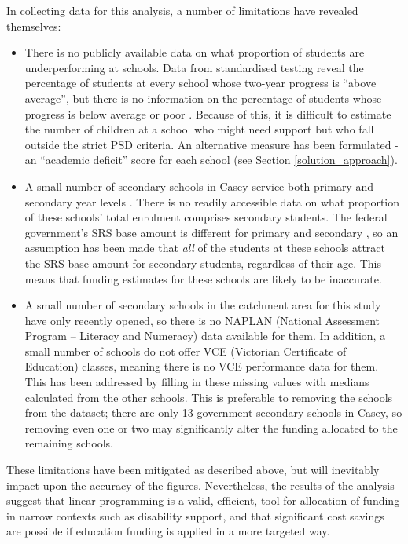 \documentclass[11pt, a4paper]{article}
\begin{document}
    In collecting data for this analysis, a number of limitations have revealed themselves:

    \begin{itemize}
        \item There is no publicly available data on what proportion of students are underperforming at schools. Data from standardised testing reveal the percentage of students at every school whose two-year progress is ``above average'', but there is no information on the percentage of students whose progress is below average or poor \parencite{naplan}. Because of this, it is difficult to estimate the number of children at a school who might need support but who fall outside the strict PSD criteria. An alternative measure has been formulated - an ``academic deficit'' score for each school (see Section \ref{solution_approach}).
        \item A small number of secondary schools in Casey service both primary and secondary year levels \parencite{casey_schools}. There is no readily accessible data on what proportion of these schools' total enrolment comprises secondary students. The federal government's SRS base amount is different for primary and secondary \parencite{srs_2020}, so an assumption has been made that \textit{all} of the students at these schools attract the SRS base amount for secondary students, regardless of their age. This means that funding estimates for these schools are likely to be inaccurate.
        \item A small number of secondary schools in the catchment area for this study have only recently opened, so there is no NAPLAN (National Assessment Program – Literacy and Numeracy) data available for them. In addition, a small number of schools do not offer VCE (Victorian Certificate of Education) classes, meaning there is no VCE performance data for them. This has been addressed by filling in these missing values with medians calculated from the other schools. This is preferable to removing the schools from the dataset; there are only 13 government secondary schools in Casey, so removing even one or two may significantly alter the funding allocated to the remaining schools.
    \end{itemize}

    These limitations have been mitigated as described above, but will inevitably impact upon the accuracy of the figures. Nevertheless, the results of the analysis suggest that linear programming is a valid, efficient, tool for allocation of funding in narrow contexts such as disability support, and that significant cost savings are possible if education funding is applied in a more targeted way.  
\end{document}
